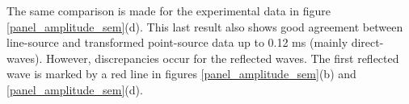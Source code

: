 \documentclass[manuscript,revised]{geophysics}
\newcommand{\twod}{2-D }
\newcommand{\thrd}{3-D }
\begin{document}
\noindent The same comparison is made for the experimental data in figure \ref{panel_amplitude_sem}(d). This last result also shows good agreement between line-source and transformed point-source data up to 0.12 ms (mainly direct-waves). However, discrepancies occur for the reflected waves. The first reflected wave is marked by a red line in figures \ref{panel_amplitude_sem}(b) and \ref{panel_amplitude_sem}(d).
\end{document}
